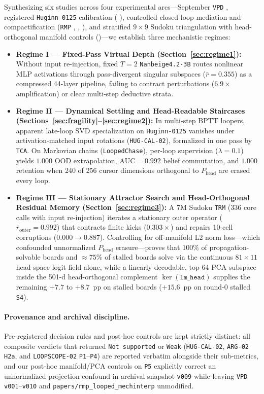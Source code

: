 \documentclass[10pt,letterpaper]{article}
\newcommand{\Phead}{P_{\mathrm{head}}}
\begin{document}
Synthesizing six studies across four experimental arcs—September \texttt{VPD} \cite{dugan2026vpd}, registered \texttt{Huginn-0125} calibration ( \cite{dugan2026hugcal}), controlled closed-loop mediation and compactification (\texttt{RMP} \cite{dugan2026rmp},  \cite{dugan2026loopscope01},  \cite{dugan2026arg02}), and stratified $9\times 9$ Sudoku triangulation with head-orthogonal manifold controls ()—we establish three mechanistic regimes:
\begin{itemize}
  \item \textbf{Regime I — Fixed-Pass Virtual Depth (Section~\ref{sec:regime1}):} Without input re-injection, fixed $T=2$ \texttt{Nanbeige4.2-3B} routes nonlinear MLP activations through pass-divergent singular subspaces ($\bar{r}=0.355$) as a compressed 44-layer pipeline, failing to contract perturbations ($6.9\times$ amplification) or clear multi-step deductive strata.
  \item \textbf{Regime II — Dynamical Settling and Head-Readable Staircases (Sections~\ref{sec:fragility}--\ref{sec:regime2}):} In multi-step BPTT loopers, apparent late-loop SVD specialization on \texttt{Huginn-0125} vanishes under activation-matched input rotations (\texttt{HUG-CAL-02}), formalized in one pass by \texttt{TCA}. On Markovian chains (\texttt{LoopedChase}), per-loop supervision ($\lambda=0.1$) yields $1.000$ OOD extrapolation, $\mathrm{AUC}=0.992$ belief commutation, and $1.000$ retention when 240 of 256 cursor dimensions orthogonal to $\Phead$ are erased every loop.
  \item \textbf{Regime III — Stationary Attractor Search and Head-Orthogonal Residual Memory (Section~\ref{sec:regime3}):} A 7M Sudoku \texttt{TRM} (336 core calls with input re-injection) iterates a stationary outer operator ($\bar{r}_{\mathrm{outer}}=0.992$) that contracts finite kicks ($0.303\times$) and repairs 10-cell corruptions ($0.000 \to 0.887$). Controlling for off-manifold L2 norm loss—which confounded unnormalized $\Phead$ erasure—proves that $100\%$ of propagation-solvable boards and $\approx 75\%$ of stalled boards solve via the continuous $81\times 11$ head-space logit field alone, while a linearly decodable, top-64 PCA subspace inside the 501-d head-orthogonal complement $\ker(\texttt{lm\_head})$ supplies the remaining $+7.7$ to $+8.7$~pp on stalled boards ($+15.6$~pp on round-0 stalled \texttt{S4}).
\end{itemize}

\paragraph{Provenance and archival discipline.} Pre-registered decision rules and post-hoc controls are kept strictly distinct: all composite verdicts that returned \texttt{Not supported} or \texttt{Weak} (\texttt{HUG-CAL-02}, \texttt{ARG-02} \texttt{H2a}, and \texttt{LOOPSCOPE-02} \texttt{P1}--\texttt{P4}) are reported verbatim alongside their sub-metrics, and our post-hoc manifold/PCA controls on \texttt{P5} explicitly correct an unnormalized projection confound in archival snapshot \texttt{v009} while leaving \texttt{VPD} \texttt{v001}--\texttt{v010} and \texttt{papers/rmp\_looped\_mechinterp} unmodified.
\end{document}
